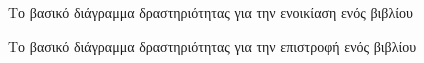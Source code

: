 \documentclass{assignment}
\begin{document}
\begin{figure}
\begin{center}
\caption{Το βασικό διάγραμμα δραστηριότητας για την ενοικίαση ενός βιβλίου}
\label{fig:activity_diagram_rent_book_basic}
\end{center}
\end{figure}

\begin{figure}
\begin{center}
\caption{Το βασικό διάγραμμα δραστηριότητας για την επιστροφή ενός βιβλίου}
\label{fig:activity_diagram_return_book_basic}
\end{center}
\end{figure}
\end{document}
